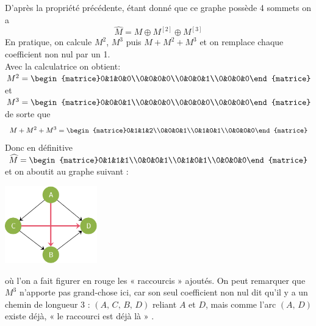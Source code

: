 \begin{methode}
    
    D'après la propriété précédente, étant donné que ce graphe possède 4 sommets on a $$\widehat{M}=M\oplus M^{[2]}\oplus M^{[3]}$$
    En pratique, on calcule $M^2$, $M^3$ puis $M+M^2+M^3$ et on remplace chaque coefficient non nul par un 1.\\
    Avec la calculatrice on obtient:
    $M^2=\begin{matrice}0&1&0&0\\0&0&0&0\\0&0&0&1\\0&0&0&0\end{matrice}$ et
    $M^3=\begin{matrice}0&0&0&1\\0&0&0&0\\0&0&0&0\\0&0&0&0\end{matrice}$ de sorte que
    $$M+M^2+M^3=\begin{matrice}0&1&1&2\\0&0&0&1\\0&1&0&1\\0&0&0&0\end{matrice}$$
    Donc en définitive $\widehat{M}=\begin{matrice}0&1&1&1\\0&0&0&1\\0&1&0&1\\0&0&0&0\end{matrice}$
    et on aboutit au graphe suivant :
    \begin{center}
        \includegraphics*[width=4cm]{graphes/img/fermeture_transitive_1.png}
    \end{center}
    où l'on a fait figurer en rouge les  «  raccourcis »  ajoutés. On peut remarquer que $M^3$ n'apporte pas grand-chose ici, car son seul coefficient non nul dit qu'il y a un chemin de longueur 3 : $(A,\,C,\,B,\,D)$ reliant $A$ et $D$, mais comme l'arc $(A,\,D)$ existe déjà,  «  le raccourci est déjà là » .
\end{methode}


